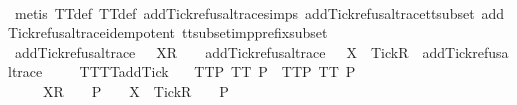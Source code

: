 \begin{isabellebody}
%
\isadelimproof
\ \ %
\endisadelimproof
%
\isatagproof
{}\isamarkupfalse%
\ {\isacharparenleft}metis\ TT{}{\isacharunderscore}def\ TT{}{\isacharunderscore}def\ add{\isacharunderscore}Tick{\isacharunderscore}refusal{\isacharunderscore}trace{\isachardot}simps{\isacharparenleft}{}{\isacharparenright}\ add{\isacharunderscore}Tick{\isacharunderscore}refusal{\isacharunderscore}trace{\isacharunderscore}tt{\isacharunderscore}subset\ add{\isacharunderscore}Tick{\isacharunderscore}refusal{\isacharunderscore}trace{\isacharunderscore}idempotent\ tt{\isacharunderscore}subset{\isacharunderscore}imp{\isacharunderscore}prefix{\isacharunderscore}subset{\isacharparenright}%
\endisatagproof
{\isafoldproof}%
%
\isadelimproof
\isanewline
%
\endisadelimproof
\isanewline
{}\isamarkupfalse%
\ {\isachardoublequoteopen}add{\isacharunderscore}Tick{\isacharunderscore}refusal{\isacharunderscore}trace\ {\isacharparenleft}{\isasymrho}\ {\isacharat}\ {\isacharbrackleft}X{\isacharbrackright}\isactrlsub R\ {\isacharhash}\ {\isasymsigma}{\isacharparenright}\ {\isacharequal}\ add{\isacharunderscore}Tick{\isacharunderscore}refusal{\isacharunderscore}trace\ {\isasymrho}\ {\isacharat}\ {\isacharbrackleft}X\ {\isasymunion}\ {\isacharbraceleft}Tick{\isacharbraceright}{\isacharbrackright}\isactrlsub R\ {\isacharhash}\ add{\isacharunderscore}Tick{\isacharunderscore}refusal{\isacharunderscore}trace\ {\isasymsigma}{\isachardoublequoteclose}\isanewline
%
\isadelimproof
\ \ %
\endisadelimproof
%
\isatagproof
{}\isamarkupfalse%
%
\endisatagproof
{\isafoldproof}%
%
\isadelimproof
\isanewline
%
\endisadelimproof
\isanewline
{}\isamarkupfalse%
\ TT{}{\isacharunderscore}TT{}{\isacharunderscore}add{\isacharunderscore}Tick{\isacharcolon}\isanewline
\ \ \ TT{}{\isacharunderscore}P{\isacharcolon}\ {\isachardoublequoteopen}TT{}\ P{\isachardoublequoteclose}\ \ TT{}{\isacharunderscore}P{\isacharcolon}\ {\isachardoublequoteopen}TT{}\ P{\isachardoublequoteclose}\isanewline
\ \ \ {\isachardoublequoteopen}{\isasymrho}\ {\isacharat}\ {\isacharbrackleft}X{\isacharbrackright}\isactrlsub R\ {\isacharhash}\ {\isasymsigma}\ {\isasymin}\ P\ {\isasymLongrightarrow}\ {\isasymrho}\ {\isacharat}\ {\isacharbrackleft}X\ {\isasymunion}\ {\isacharbraceleft}Tick{\isacharbraceright}{\isacharbrackright}\isactrlsub R\ {\isacharhash}\ {\isasymsigma}\ {\isasymin}\ P{\isachardoublequoteclose}\isanewline
%
\isadelimproof

\end{isabellebody}

